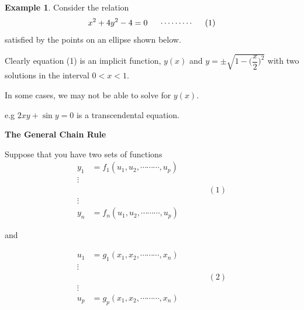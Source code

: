 \documentclass[11pt,a4paper]{article}
\theoremstyle{definition}
\newtheorem{exa}[thm]{Example}
\newcommand{\subhead}[1]{%
  \par\medskip\noindent\textbf{#1}\par\nobreak\smallskip}
\begin{document}
\begin{exa}


Consider the relation $$x^2 + 4y^2 - 4 =0\hspace{0.5cm}\cdots\cdots\cdots\hspace{0.5cm} (1)$$ satisfied by the points on an ellipse shown below.


\begin{figure}[H]
\centering
{}
\end{figure}

Clearly equation (1) is an implicit function, $y(x)$ and $\displaystyle{y = \pm \sqrt{1 - \bigg(\dfrac{x}{2}\bigg)^2}}$ with two solutions in the interval $0< x<1$.


In some cases, we may not be able to solve for $y(x)$.


e.g $2xy + \sin y =0$ is a transcendental equation.
\end{exa}


\subhead{The General Chain Rule}


Suppose that you have two sets of functions 
\begin{align*}
y_1 & = f_1 (u_1,u_2,\cdots\cdots\cdots, u_p)\\
\vdots &\\
        &   \hspace{6cm} (1)\\
\vdots &\\
y_n & = f_n (u_1,u_2,\cdots\cdots\cdots, u_p)
\end{align*}

and

\begin{align*}
u_1 & = g_1 (x_1,x_2,\cdots\cdots\cdots, x_n)\\
\vdots &\\
        &   \hspace{6cm} (2)\\
\vdots &\\
u_p & = g_p (x_1,x_2,\cdots\cdots\cdots, x_n)
\end{align*}
\end{document}
